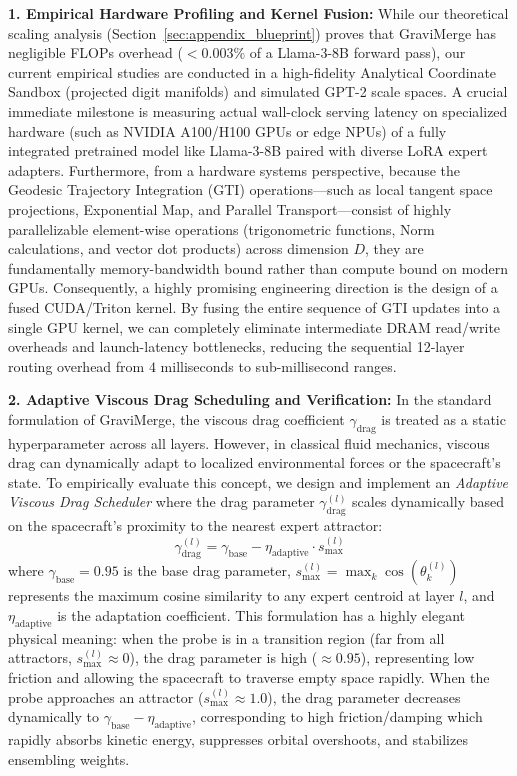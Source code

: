 \textbf{1. Empirical Hardware Profiling and Kernel Fusion: } While our theoretical scaling analysis (Section~\ref{sec:appendix_blueprint}) proves that GraviMerge has negligible FLOPs overhead ($<0.003\%$ of a Llama-3-8B forward pass), our current empirical studies are conducted in a high-fidelity Analytical Coordinate Sandbox (projected digit manifolds) and simulated GPT-2 scale spaces. A crucial immediate milestone is measuring actual wall-clock serving latency on specialized hardware (such as NVIDIA A100/H100 GPUs or edge NPUs) of a fully integrated pretrained model like Llama-3-8B paired with diverse LoRA expert adapters. Furthermore, from a hardware systems perspective, because the Geodesic Trajectory Integration (GTI) operations---such as local tangent space projections, Exponential Map, and Parallel Transport---consist of highly parallelizable element-wise operations (trigonometric functions, Norm calculations, and vector dot products) across dimension $D$, they are fundamentally memory-bandwidth bound rather than compute bound on modern GPUs. Consequently, a highly promising engineering direction is the design of a fused CUDA/Triton kernel. By fusing the entire sequence of GTI updates into a single GPU kernel, we can completely eliminate intermediate DRAM read/write overheads and launch-latency bottlenecks, reducing the sequential 12-layer routing overhead from $4$ milliseconds to sub-millisecond ranges.

\textbf{2. Adaptive Viscous Drag Scheduling and Verification: } In the standard formulation of GraviMerge, the viscous drag coefficient $\gamma_{\text{drag}}$ is treated as a static hyperparameter across all layers. However, in classical fluid mechanics, viscous drag can dynamically adapt to localized environmental forces or the spacecraft's state. To empirically evaluate this concept, we design and implement an \textit{Adaptive Viscous Drag Scheduler} where the drag parameter $\gamma_{\text{drag}}^{(l)}$ scales dynamically based on the spacecraft's proximity to the nearest expert attractor:
\begin{equation}
    \gamma_{\text{drag}}^{(l)} = \gamma_{\text{base}} - \eta_{\text{adaptive}} \cdot s_{\max}^{(l)}
\end{equation}
where $\gamma_{\text{base}} = 0.95$ is the base drag parameter, $s_{\max}^{(l)} = \max_k \cos(\theta_k^{(l)})$ represents the maximum cosine similarity to any expert centroid at layer $l$, and $\eta_{\text{adaptive}}$ is the adaptation coefficient. This formulation has a highly elegant physical meaning: when the probe is in a transition region (far from all attractors, $s_{\max}^{(l)} \approx 0$), the drag parameter is high ($\approx 0.95$), representing low friction and allowing the spacecraft to traverse empty space rapidly. When the probe approaches an attractor ($s_{\max}^{(l)} \approx 1.0$), the drag parameter decreases dynamically to $\gamma_{\text{base}} - \eta_{\text{adaptive}}$, corresponding to high friction/damping which rapidly absorbs kinetic energy, suppresses orbital overshoots, and stabilizes ensembling weights.

